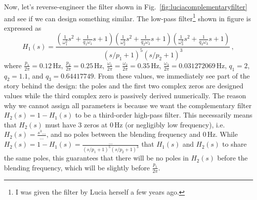 Now, let's reverse-engineer the filter shown in Fig.~\ref{fig:luciacomplementaryfilter} and see if we can design something similar.
The low-pass filter\footnote{I was given the filter by Lucia herself a few years ago.} shown in figure is expressed as
\begin{equation}
	H_1(s) = \frac{\left(\frac{1}{\omega_1^2}s^2+\frac{1}{q_1\omega_1}s+1\right)\left(\frac{1}{\omega_2^2}s^2+\frac{1}{q_2\omega_2}s+1\right)\left(\frac{1}{\omega_3^2}s^2+\frac{1}{q_3\omega_3}s+1\right)}{(s/p_1+1)^5(s/p_2+1)^3}\,,
	\label{eqn:complementary_low-pass_filter_lucia}
\end{equation}
where $\frac{p_1}{2\pi} = 0.12\,\mathrm{Hz}$, $\frac{p_2}{2\pi} = 0.25\,\mathrm{Hz}$, $\frac{\omega_1}{2\pi}=\frac{\omega_2}{2\pi} = 0.35\,\mathrm{Hz}$, $\frac{\omega_3}{2\pi} = 0.031272069\,\mathrm{Hz}$, $q_1 = 2$, $q_2 = 1.1$, and $q_3 = 0.64417749$.
From these values, we immediately see part of the story behind the design: the poles and the first two complex zeros are designed values while the third complex zero is passively derived numerically.
The reason why we cannot assign all parameters is because we want the complementary filter
$H_2(s)=1-H_1(s)$ to be a third-order high-pass filter.
This necessarily means that $H_2(s)$ must have 3 zeros at $0\,\mathrm{Hz}$ (or negligibly low frequency), i.e. $H_2(s) = \frac{s^3\dots}{\dots}$, and no poles between the blending frequency and $0\,\mathrm{Hz}$.
While $H_2(s) = 1-H_1(s) = \frac{\dots}{\left(s/p_1+1\right)^5\left(s/p_2+1\right)^3}$ that $H_1(s)$ and $H_2(s)$ to share the same poles, this guarantees that there will be no poles in $H_2(s)$ before the blending frequency, which will be slightly before $\frac{p_1}{2\pi}$.

